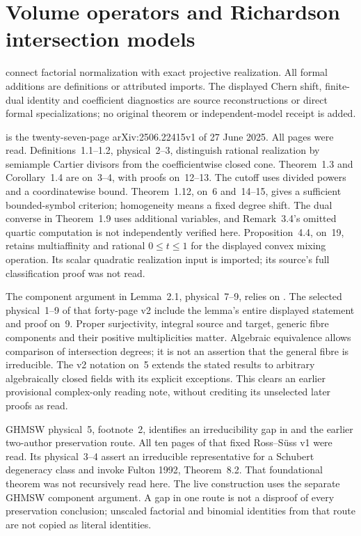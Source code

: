 \section{Volume operators and Richardson intersection models}
\label{sec:appL-volume-Richardson-sources}

connect factorial normalization with exact projective realization.
All formal additions are definitions or attributed imports.
The displayed Chern shift, finite-dual identity and coefficient
diagnostics are source reconstructions or direct formal specializations;
no original theorem or independent-model receipt is added.

\cite{GrundHuhMichalekSuessWang25VolumeV1} is the twenty-seven-page
arXiv:2506.22415v1 of 27 June 2025. All pages were read.
Definitions~1.1--1.2, physical~2--3, distinguish rational
realization by semiample Cartier divisors from the coefficientwise
closed cone. Theorem~1.3 and Corollary~1.4 are on~3--4,
with proofs on~12--13. The cutoff uses divided powers and a
coordinatewise bound. Theorem~1.12, on~6 and~14--15, gives
a sufficient bounded-symbol criterion; homogeneity means a fixed
degree shift. The dual converse in Theorem~1.9 uses additional
variables, and Remark~3.4's omitted quartic computation is not
independently verified here. Proposition~4.4, on~19, retains
multiaffinity and rational $0\leq t\leq1$ for the displayed
convex mixing operation. Its scalar quadratic realization input
is imported; its source's full classification proof was not read.

The component argument in Lemma~2.1, physical~7--9, relies on
\cite[Lemma~2.6]{HuangHuhMichalekWangWang25RealizationsV2}.
The selected physical~1--9 of that forty-page v2 include the
lemma's entire displayed statement and proof on~9. Proper
surjectivity, integral source and target, generic fibre components
and their positive multiplicities matter. Algebraic equivalence
allows comparison of intersection degrees; it is not an assertion
that the general fibre is irreducible. The v2 notation on~5
extends the stated results to arbitrary algebraically closed fields
with its explicit exceptions. This clears an earlier provisional
complex-only reading note, without crediting its unselected later
proofs as read.

GHMSW physical~5, footnote~2, identifies an irreducibility gap in
\cite[Proposition~2.6]{RossSuess25DiagonalizationsV1} and the
earlier two-author preservation route. All ten pages of that fixed
Ross--S\"uss v1 were read. Its physical~3--4 assert an irreducible
representative for a Schubert degeneracy class and invoke Fulton
1992, Theorem~8.2. That foundational theorem was not recursively
read here. The live construction uses the separate GHMSW
component argument. A gap in one route is not a disproof of
every preservation conclusion; unscaled factorial and binomial
identities from that route are not copied as literal identities.

